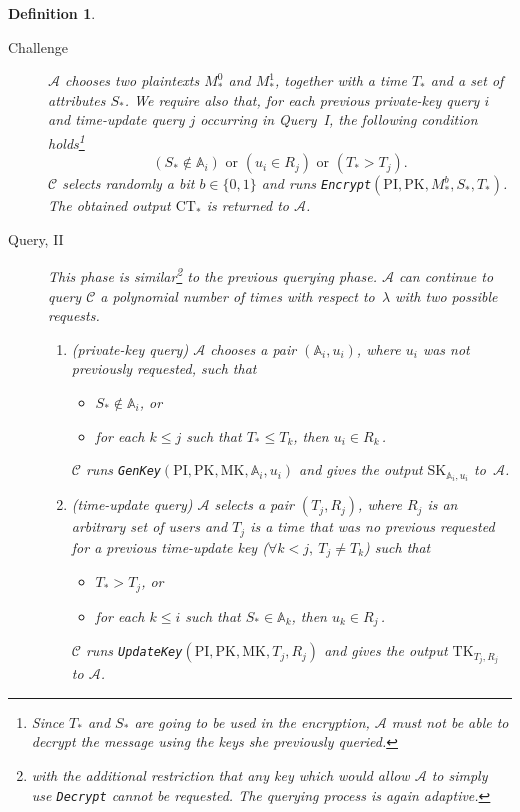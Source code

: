 \documentclass[a4paper,10pt]{article}
\newtheorem{definition}{Definition}
\newcommand{\singlefunction}[1]{\texttt{#1}}
\begin{document}
\begin{definition}
\begin{description}
			
			\item[Challenge]
			\label{security.challenge}
			$\mathcal{A}$ chooses two plaintexts $M_*^0$ and $M_*^1$, together with a time $T_*$ and a set of attributes $S_*$.
			We require also that, for each previous private-key query $i$ and  time-update query $j$ occurring in Query~I, the following condition holds\footnote{Since $T_*$ and $S_*$ are going to be used in the encryption,   $\mathcal{A}$ must not be able to decrypt the message using the keys she previously queried.}
				\[(S_*\not\in \mathbb{A}_i) \mbox{ or }
				(u_i\in R_j) \mbox{ or }
				(T_*>T_j).\]
			$\mathcal{C}$ selects randomly a bit $b\in \{0,1\}$ and runs \singlefunction{Encrypt}$(\mathit{\mathrm{PI}},\mathit{\mathrm{PK}},M_*^b,S_*,T_*)$.\\ The obtained output $\mathrm{CT}_*$ is returned to $\mathcal{A}$.
			
			\item[Query, II]
			This phase is similar\footnote{with the additional restriction that any key which would allow $\mathcal{A}$ to simply use \singlefunction{Decrypt} cannot be requested. The querying process is again adaptive.} to the previous querying phase.			
			$\mathcal{A}$ can continue to query $\mathcal{C}$ a polynomial number of times with respect to~$\lambda$ with two possible requests.
			\begin{enumerate}
				\item
				(private-key query)
				$\mathcal{A}$ chooses a pair $(\mathbb{A}_i,u_i)$, where  $u_i$  was not previously requested, such that 
				\begin{itemize}
				\item $S_*\not\in \mathbb{A}_i$, or
				\item for each $k\leq j$ such that $T_*\leq T_k$, then $u_i\in R_k\,$.
				\end{itemize}
				$\mathcal{C}$ runs \singlefunction{GenKey}$(\mathit{\mathrm{PI}},\mathit{\mathrm{PK}},\mathit{\mathrm{MK}},\mathbb{A}_i,u_i)$ and gives the output $\mathit{\mathrm{SK}}_{\mathbb{A}_i,u_i}$ to~$\mathcal{A}$.
				
				\item
				(time-update query)
				$\mathcal{A}$ selects a pair $(T_j,R_j)$, where $R_j$ is an arbitrary set of users and $T_j$ is a time that was no previous requested for a previous time-update key (${\forall k < j},\:\allowbreak {T_j\neq T_{k}}$) such that
				\begin{itemize} 
				\item $T_*>T_j$, or
				\item for each $k\leq i$ such that $S_*\in \mathbb{A}_k$, then $u_k\in R_j\,$.
				\end{itemize}
				$\mathcal{C}$ runs \singlefunction{UpdateKey}$(\mathit{\mathrm{PI}},\mathit{\mathrm{PK}},\mathit{\mathrm{MK}},T_j,R_j)$ and gives the output  $\mathit{\mathrm{TK}}_{T_j,R_j}$  to $\mathcal{A}$.
			\end{enumerate}
			

\end{description}
\end{definition}
\end{document}
